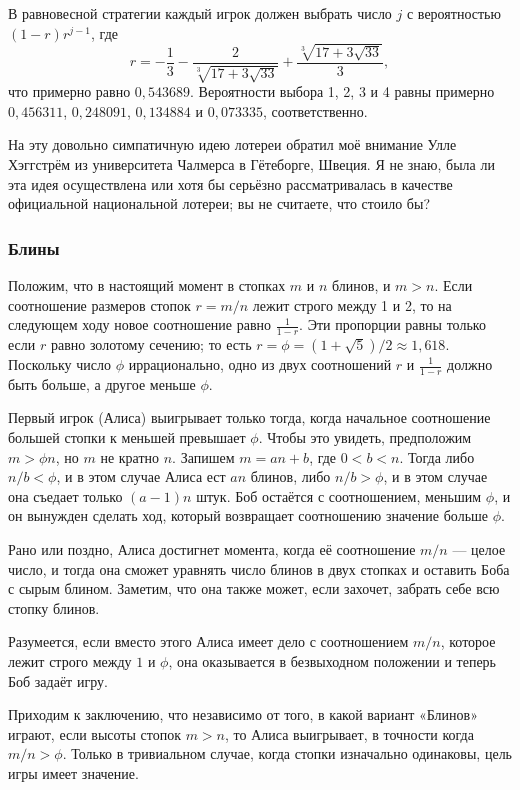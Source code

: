 В равновесной стратегии каждый игрок должен выбрать число $j$ с вероятностью $(1-r)r^{j-1}$, где 
\[r = -\frac13-\frac2{\sqrt[3]{17+3\sqrt{33}}}+\frac{\sqrt[3]{17+3\sqrt{33}}}3,\]
что примерно равно $0{,}543689$.
Вероятности выбора 1, 2, 3 и 4 равны примерно $0{,}456311$, $0{,}248091$, $0{,}134884$ и $0{,}073335$, соответственно.

На эту довольно симпатичную идею лотереи обратил моё внимание Улле Хэггстрём из университета Чалмерса в Гётеборге, Швеция. %
Я не знаю, была ли эта идея осуществлена или хотя бы серьёзно рассматривалась в качестве официальной национальной лотереи; вы не считаете, что стоило бы?

\subsubsection*{Блины}%

Положим, что в настоящий момент в стопках $m$ и $n$ блинов, и $m > n$.
Если соотношение размеров стопок $r = m/n$ лежит строго между 1 и 2, то на следующем ходу новое соотношение равно $\tfrac1{1-r}$.
Эти пропорции равны только если $r$ равно золотому сечению;
то есть $r=\phi=(1+\sqrt{5})/2\approx 1{,}618$.
Поскольку число $\phi$ иррационально, одно из двух соотношений $r$ и $\tfrac1{1-r}$ должно быть больше, а другое меньше $\phi$.

Первый игрок (Алиса) выигрывает только тогда, когда начальное соотношение большей стопки к меньшей превышает $\phi$.
Чтобы это увидеть, предположим $m>\phi n$, но $m$ не кратно $n$.
Запишем $m=an+b$, где $0<b<n$.
Тогда либо $n/b<\phi$, и в этом случае Алиса ест $an$ блинов, либо $n/b>\phi$, и в этом случае она съедает только $(a-1)n$ штук.
Боб остаётся с соотношением, меньшим $\phi$, и он вынужден сделать ход, который возвращает соотношению значение больше $\phi$.

Рано или поздно, Алиса достигнет момента, когда её соотношение $m/n$ --- целое число, и тогда она сможет уравнять число блинов в двух стопках и оставить Боба с сырым блином.
Заметим, что она также может, если захочет, забрать себе всю стопку блинов.

Разумеется, если вместо этого Алиса имеет дело с соотношением $m/n$, которое лежит строго между $1$ и $\phi$, она оказывается в безвыходном положении %
и теперь Боб задаёт игру.

Приходим к заключению, что независимо от того, в какой вариант «Блинов» играют, если высоты стопок $m>n$, то Алиса выигрывает, в точности когда $m/n>\phi$.
Только в тривиальном случае, когда стопки изначально одинаковы, цель игры имеет значение.\heart

